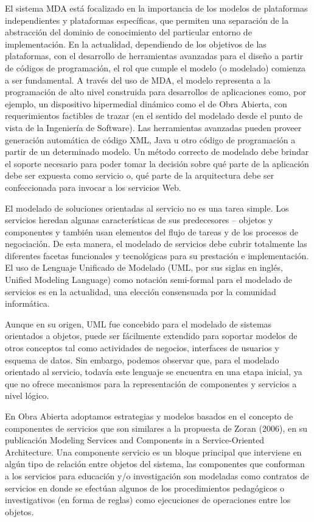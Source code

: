 El sistema MDA está focalizado en la importancia de los modelos de
plataformas independientes y plataformas específicas, que permiten una
separación de la abstracción del dominio de conocimiento del particular entorno
de implementación. En la actualidad, dependiendo de los objetivos de
las plataformas, con el desarrollo de herramientas avanzadas para el diseño a
partir de códigos de programación, el rol que cumple el modelo (o
modelado) comienza a ser fundamental. A través del uso de MDA, el modelo
representa a la programación de alto nivel construida para desarrollos de
aplicaciones como, por ejemplo, un dispositivo hipermedial dinámico como el de
Obra Abierta, con requerimientos factibles de trazar (en el sentido del modelado
desde el punto de vista de la Ingeniería de Software). Las herramientas
avanzadas pueden proveer generación automática de código XML, Java u otro código
de programación a partir de un determinado modelo. Un método correcto de
modelado debe brindar el soporte necesario para poder tomar la decisión sobre
qué parte de la aplicación debe ser expuesta como servicio o, qué parte de la
arquitectura debe ser confeccionada para invocar a los servicios Web.


El modelado de soluciones orientadas al servicio no es una tarea simple. Los
servicios heredan algunas características de sus predecesores – objetos y
componentes y también usan elementos del flujo de tareas y de los procesos de
negociación. De esta manera, el modelado de servicios debe cubrir totalmente las
diferentes facetas funcionales y tecnológicas para su prestación
e implementación. El uso de Lenguaje Unificado de Modelado (UML, por sus siglas
en inglés, Unified Modeling Language) como notación semi-formal para el modelado
de servicios es en la actualidad, una elección consensuada por la
comunidad informática.

Aunque en su origen, UML fue concebido para el modelado de sistemas orientados a
objetos, puede ser fácilmente extendido para soportar modelos de otros conceptos
tal como actividades de negocios, interfaces de usuarios y esquema de datos. Sin
embargo, podemos observar que, para el modelado orientado al servicio, todavía
este lenguaje se encuentra en una etapa inicial, ya que no ofrece mecanismos
para la representación de componentes y servicios a nivel lógico.


En Obra Abierta adoptamos estrategias y modelos basados en el concepto de
componentes de servicios que son similares a la propuesta de Zoran (2006), en su
publicación Modeling Services and Components in a Service-Oriented Architecture.
Una componente servicio es un bloque principal que interviene en algún tipo de
relación entre objetos del sistema, las componentes que conforman a los
servicios para educación y/o investigación son modeladas como contratos de
servicios en donde se efectúan algunos de los procedimientos pedagógicos o
investigativos (en forma de reglas) como ejecuciones de operaciones entre los
objetos.


